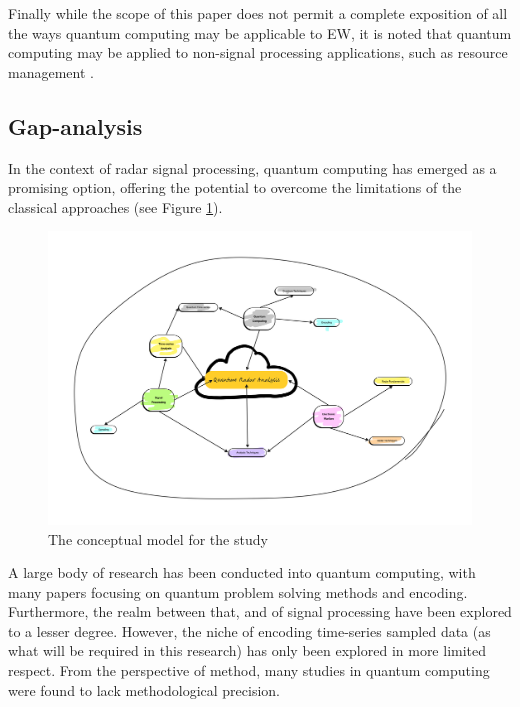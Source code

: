 Finally while the scope of this paper does not permit a complete exposition of all the ways quantum computing may be applicable to \ac{EW}, it is noted that quantum computing may be applied to non-signal processing applications, such as resource management \cite{charlish_autonomous_2011, charlish_development_2020}.

\subsection{Gap-analysis}

In the context of radar signal processing, quantum computing has emerged as a promising option, offering the potential to overcome the limitations of the classical approaches (see Figure \ref{Fig:conceptual_model}).

\begin{figure}
    \centering
    \includegraphics[width=1\textwidth]{Figures/Literature review - mind map.png}
    \caption{The conceptual model for the study}
    \label{Fig:conceptual_model}
\end{figure}

A large body of research has been conducted into quantum computing, with many papers focusing on quantum problem solving methods and encoding.
Furthermore, the realm between that, and of signal processing have been explored to a lesser degree.
However, the niche of encoding time-series sampled data (as what will be required in this research) has only been explored in more limited respect.
From the perspective of method, many studies in quantum computing were found to lack methodological precision.

